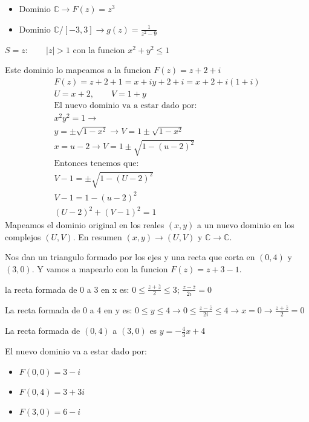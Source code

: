 \documentclass{article}
\newcommand{\caja}[3]{%
  \begin{tcolorbox}[colback=#1!5!white,colframe=#1!25!black,title=#2]
    #3
  \end{tcolorbox}%
}
\begin{document}
\caja{black}{Ejemplos }{
  \begin{itemize}
    \item Dominio $ \mathbb{C } \rightarrow F(z) = z^3 $
    \item Dominio $ \mathbb{C }/[-3,3]\rightarrow   g(z) = \frac{1}{z ^ {2 }-9}  $
  \end{itemize}
}
\caja{red}{Traslacion del dominio}{
  $ S = z : \qquad |z|>1  $ con la funcion $ x ^ {2 }+y ^ {2 }\leq 1  $

  Este dominio lo mapeamos a la funcion $ F(z) = z+2+i $
  \begin{gather}
     F(z) = z+2+1 = x+iy+2+i = x+2+i(1+i)\\
     U =x+2, \qquad V = 1+y\\
     \text{El nuevo dominio va a estar dado por: }\\
     x ^ {2 } y ^ {2 } = 1 \rightarrow \\
     y = \pm \sqrt{1-x ^ {2 }} \rightarrow V = 1\pm \sqrt{1-x ^ {2 }} \\
     x = u-2 \rightarrow V = 1\pm \sqrt{1-(u-2)^ {2 }}   \\
     \text{Entonces tenemos que: }\\
     V-1 = \pm \sqrt{1-(U-2) ^ {2 }} \\
     V-1 = 1-(u-2)^ {2 }\\
     (U-2)^ {2 }+(V-1)^ {2} = 1
    \label{eq:Dom_ej1}
  \end{gather}
  Mapeamos el dominio original en los reales $ (x,y ) $ a un nuevo dominio en los complejos $ (U,V) $. En resumen $ (x,y)\rightarrow (U,V)  $ y $ \mathbb{C}\rightarrow \mathbb{C}  $.
}

\caja{red}{Traslacion }{
  Nos dan un triangulo formado por los ejes y una recta que corta en $ (0,4) $ y $ (3,0) $. Y vamos a mapearlo con la funcion $ F(z) = z+3-1  $. 

  la recta formada de 0 a 3 en x es: $ 0\leq \frac{z+\bar z }{2 }\leq 3   $; $ \frac{z-\bar z }{2i } = 0   $

  La recta formada de 0 a 4 en y es: $ 0\leq y\leq 4 \rightarrow  0\leq \frac{z- \bar z }{2i }\leq 4    \rightarrow x=0 \rightarrow \frac{z+\bar z}{2} = 0   $

  La recta formada de $ (0,4) $ a $(3,0)$ es $ y = -\frac{4}{3}x+4  $


  El nuevo dominio va a estar dado por:
  \begin{itemize}
    \item $F(0,0) = 3-i $
    \item $ F(0,4) = 3+3i $
    \item $ F(3,0) = 6-i $
  \end{itemize}
}
\end{document}
